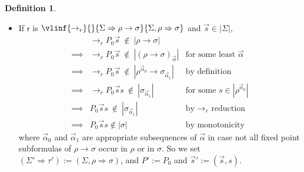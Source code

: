 \documentclass[10pt,a4paper]{amsart}
\theoremstyle{plain}
\theoremstyle{definition}
\newtheorem{definition}[definition]{Definition}
\newcommand{\dfn}{:=}
\theoremstyle{plain}
\theoremstyle{definition} %
\newcommand{\arrow}{\to}
\newcommand{\seqar}{\Rightarrow}
\newcommand{\infrule}{\mathsf{r}}
\newcommand{\rrule}{\infrule} %
\newcommand{\rr}[1]{#1_r}
\newcommand{\der}{P}
\newcommand{\hr}[1]{|#1|}
\begin{document}
\begin{definition}
\begin{itemize}
\item If $\rrule$ is
    \(
    \vlinf{\rr\arrow}{}{\Sigma \seqar \rho \to \sigma }{\Sigma, \rho \seqar \sigma}
    \)
    and $\vec s \in \hr{\Sigma}$,
    \[
    \begin{array}{rll}
         & {\rr\arrow } {\der_0}\vec s\  \notin\  \hr{\rho\to \sigma} & \\
         \implies & {\rr \arrow} {\der_0} \vec s \  \notin\  \hr{(\rho \to \sigma)_{\vec \alpha}} & \text{for some least $\vec \alpha$}\\
         \implies & \rr \arrow  \der_0  \vec s\  \notin \ \hr{\rho^{\vec \alpha_0} \to \sigma_{\vec \alpha_1}} & \text{by definition} \\
         \implies & \rr \arrow{\der_0}  \vec s s \ \notin\  \hr{ \sigma_{\vec \alpha_1}} & \text{for some $s \in \hr{\rho^{\vec \alpha_0}}$} \\
         \implies & \der_0 \vec s  s\  \notin \ \hr{ \sigma_{\vec \alpha_1}} & \text{by $\rr\arrow$ reduction} \\
         \implies & \der_0 \vec s s \notin \hr{ \sigma} & \text{by monotonicity}
    \end{array}
    \]
    where $\vec \alpha_0$ and $\vec \alpha_1$ are appropriate subsequences of $\vec \alpha$ in case not all fixed point subformulas of $\rho \to \sigma$ occur in $\rho$ or in $\sigma$.
    So we set $(\Sigma' \seqar \tau') := (\Sigma, \rho \seqar \sigma)$, and $\der' \dfn \der_0$ and $\vec s' := (\vec s,s)$.
    

\end{itemize}
\end{definition}
\end{document}
